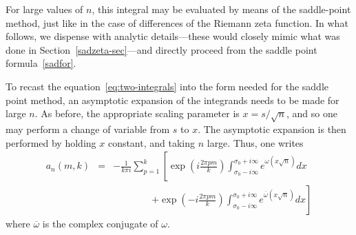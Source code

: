 \documentclass{amsart}
\begin{document}
For large values of $n$, this integral may be evaluated by means
of the saddle-point method, just like in the case of
differences of the Riemann zeta function.
% 
In what follows, we dispense with analytic details---these would
closely mimic what was done in Section~\ref{sadzeta-sec}---and directly proceed  
from the saddle point formula~\eqref{sadfor}.


To recast the equation~\eqref{eq:two-integrals} into the form needed
for the saddle point method, an asymptotic expansion of the
integrands needs to be made for large $n$. 
As before, the appropriate scaling parameter is $x=s/\sqrt{n}$,
and so one may perform a change of variable from $s$ to $x$. The asymptotic
expansion is then performed by holding $x$ constant, and taking $n$
large. Thus, one writes 
\begin{eqnarray}
a_{n}(m,k) & = & -\frac{1}{k\pi i}\sum_{p=1}^{k}
\left[\exp\left(i\frac{2\pi pm}{k}\right)
\int_{\sigma_{0}-i\infty}^{\sigma_{0}+i\infty}e^{\omega(x\sqrt{n})}dx\right.
\label{eq:saddle}\\
 &  & \qquad \qquad \left.+\exp\left(-i\frac{2\pi pm}{k}\right)
\int_{\sigma_{0}-i\infty}^{\sigma_{0}+i\infty}
e^{\overline{\omega}(x\sqrt{n})}dx\right]
\end{eqnarray}
 where $\overline{\omega}$ is the complex conjugate of $\omega$. 
\end{document}
